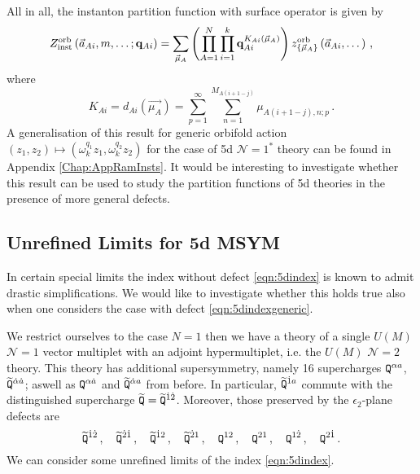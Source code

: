 \documentclass[main.tex]{subfiles}
\begin{document}
All in all, the instanton partition function with surface operator is given by
\begin{equation}
Z_{\text{inst}}^{\text{orb}}\left(\vec{a}_{Ai},m,\dots;\mathbf{q}_{Ai}\right)=\sum_{\vec{\mu}_A} \left(\prod_{A=1}^N\prod_{i=1}^k\mathbf{q}_{Ai}^{K_{Ai}(\vec{\mu}_{A})}\right)z^{\text{orb}}_{\{\vec{\mu}_A\}}\left(\vec{a}_{Ai},\dots\right)\,,
\end{equation}
where
\begin{equation}
K_{Ai}=d_{Ai}(\vec{\mu_A})=\sum_{p=1}^{\infty}\sum_{n=1}^{M_{A(i+1-j)}}\mu_{A(i+1-j),n;p}\,.
\end{equation}
A generalisation of this result for generic orbifold action $(z_1,z_2)\mapsto(\omega_k^{q_1}z_1,\omega_k^{q_2}z_2)$ for the case of 5d $\mathcal{N}=1^*$ theory can be found in Appendix \ref{Chap:AppRamInsts}. It would be interesting to investigate whether this result can be used to study the partition functions of 5d theories in the presence of more general defects. 
\subsection{Unrefined Limits for 5d MSYM}
In certain special limits the index without defect \eqref{eqn:5dindex} is known to admit drastic simplifications. We would like to investigate whether this holds true also when one considers the case with defect \eqref{eqn:5dindexgeneric}.

We restrict ourselves to the case $N=1$ then we have a theory of a single $U(M)$ $\mathcal{N}=1$ vector multiplet with an adjoint hypermultiplet, i.e. the $U(M)$ $\mathcal{N}=2$ theory. This theory has additional supersymmetry, namely 16 supercharges $\mathtt{Q}^{\alpha a}$, $\widetilde{\mathtt{Q}}^{\dot\alpha \dot a}$; aswell as $\mathtt{Q}^{\alpha \dot a}$ and $\widetilde{\mathtt{Q}}^{\dot\alpha a}$ from before.
In particular, $\widetilde{\mathtt{Q}}^{\dot1a}$ commute with the distinguished supercharge $\widetilde{\mathtt{Q}}=\widetilde{\mathtt{Q}}^{\dot1\dot2}$.
Moreover, those preserved by the $\epsilon_2$-plane defects are
\begin{equation}
\widetilde{\mathtt{Q}}^{\dot1\dot2}\,,\quad \widetilde{\mathtt{Q}}^{\dot2\dot1}\,,\quad \widetilde{\mathtt{Q}}^{\dot12}\,,\quad \widetilde{\mathtt{Q}}^{\dot21}\,,\quad \mathtt{Q}^{12}\,,\quad \mathtt{Q}^{21}\,,\quad \mathtt{Q}^{1\dot2}\,,\quad \mathtt{Q}^{2\dot1}\,.
\end{equation}
We can consider some unrefined limits of the index \eqref{eqn:5dindex}. 
\end{document}
